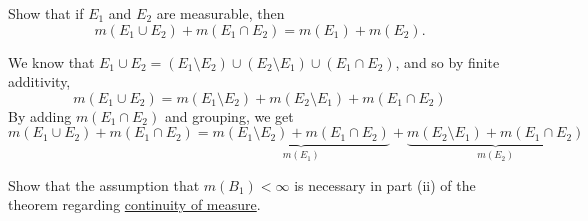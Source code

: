   \begin{exercise}[Royden 2.24]
    Show that if $E_1$ and $E_2$ are measurable, then
    \begin{equation*}
      m(E_1 \cup E_2) + m(E_1 \cap E_2) = m(E_1) + m(E_2).
    \end{equation*}
  \end{exercise}
  \begin{solution}
    We know that $E_1 \cup E_2 = (E_1 \setminus E_2) \cup (E_2 \setminus E_1) \cup (E_1 \cap E_2)$, and so by finite additivity, 
    \begin{equation}
      m(E_1 \cup E_2) = m(E_1 \setminus E_2) + m(E_2 \setminus E_1) + m(E_1 \cap E_2) 
    \end{equation}
    By adding $m(E_1 \cap E_2)$ and grouping, we get 
    \begin{equation}
      m(E_1 \cup E_2) + m(E_1 \cap E_2) = \underbrace{m(E_1 \setminus E_2) + m(E_1 \cap E_2)}_{m(E_1)} + \underbrace{m(E_2 \setminus E_1) + m(E_1 \cap E_2)}_{m(E_2)}
    \end{equation}
  \end{solution}

  \begin{exercise}[Royden 2.25]
    Show that the assumption that $m(B_1) < \infty$ is necessary in part (ii) of the theorem regarding \hyperref[thm:continuity-of-measure]{continuity of measure}.
  \end{exercise}

